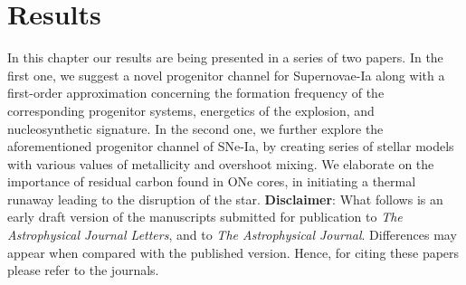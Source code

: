 \documentclass[../../main/thesis_msc.tex]{subfiles}
\begin{document}
	\chapter{Results}
	
	
	In this chapter our results are being presented in a series of two papers. In the first one, we suggest a novel progenitor channel for Supernovae-Ia along with a first-order approximation concerning the formation frequency of the corresponding progenitor systems, energetics of the explosion, and nucleosynthetic signature. In the second one, we further explore the aforementioned progenitor channel of SNe-Ia, by creating series of stellar models with various values of metallicity and overshoot mixing. We elaborate on the importance of residual carbon found in ONe cores, in initiating a thermal runaway leading to the disruption of the star.
	\newline
	\noindent \textbf{Disclaimer}: What follows is an early draft version of the manuscripts submitted for publication to \textit{The Astrophysical Journal Letters}, and to \textit{The Astrophysical Journal}. Differences may appear when compared with the published version. Hence, for citing these papers please refer to the journals.
	
	\newpage
	\thispagestyle{empty}
     \null\newpage
	
		
            
           
            
     \thispagestyle{empty}
     \null\newpage
     
    
\end{document}
